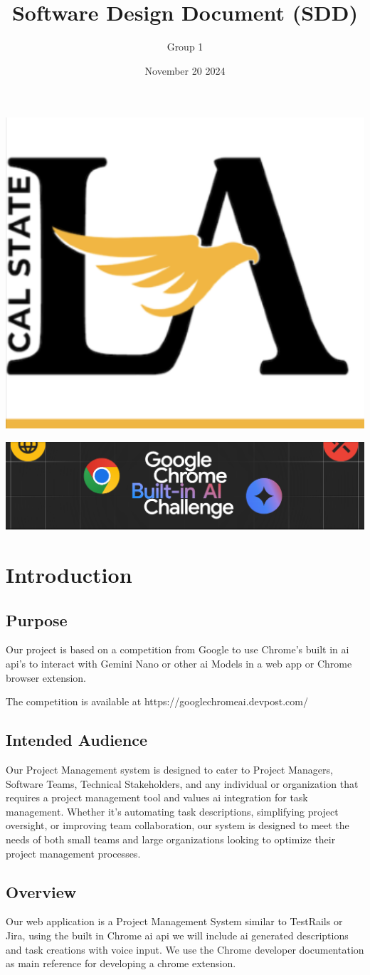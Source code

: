 \documentclass{article}
\title{Software Design Document (SDD)}
\author{Group 1 }
\date{November 20 2024}
\begin{document}
\maketitle  
\pagebreak

\tableofcontents
\pagebreak

\includegraphics[width=0.3\linewidth]{./logo/csula.png} 

\includegraphics[width=0.3\linewidth]{./logo/chromeai.png} 
\section{Introduction}

\subsection{Purpose}
Our project is based on a competition from Google to use Chrome's built in \Gls{ai} \Gls{api}'s to interact with Gemini Nano or other \Gls{ai} Models in a web app or Chrome browser extension. 

The competition is available at https://googlechromeai.devpost.com/ \cite{devpost}

\subsection{Intended Audience}
Our Project Management system is designed to cater to Project Managers, Software Teams, Technical Stakeholders, and any individual or organization that requires a project management tool and values \Gls{ai} integration for task management. Whether it's automating task descriptions, simplifying project oversight, or improving team collaboration, our system is designed to meet the needs of both small teams and large organizations looking to optimize their project management processes.


\subsection{Overview}
Our web application is a Project Management System similar to TestRails or Jira, using the built in Chrome \Gls{ai} \Gls{api} we will include ai generated descriptions and task creations with voice input. We use the Chrome developer documentation\cite{dev} as main reference for developing a chrome extension.
\end{document}
